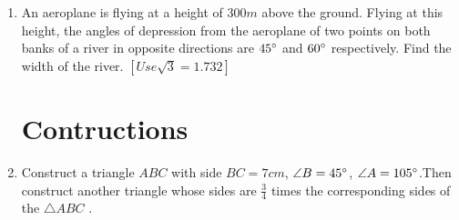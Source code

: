 \documentclass{article}
\providecommand{\sbrak}[1]{\ensuremath{\left[#1\right]}}
\begin{document}
\begin{enumerate}
																																																																																		          \item An aeroplane is flying at a height of $300 m$ above the ground. Flying at this height, the angles of depression from the aeroplane of two points on both banks of a river in opposite directions are $45\degree$ and $60\degree$ respectively. Find the width of the river. $\sbrak{Use \sqrt 3 = 1.732}$

																																																																																				  \section{Contructions}

																																																																																				      \item Construct a triangle $ABC$ with side $BC = 7 cm$, $\angle B = 45\degree$, $\angle A = 105\degree$.Then construct another triangle whose sides are $\frac{3}{4}$ times the corresponding sides of the $\triangle ABC$ .

											    \end{enumerate}
										    
\end{document}
